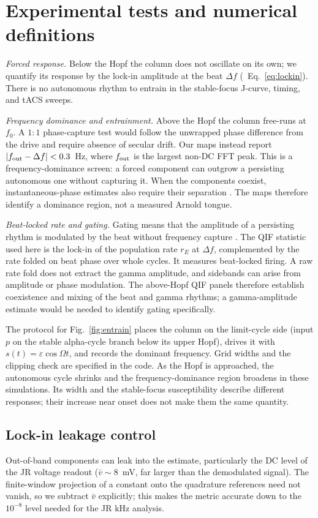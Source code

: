 \documentclass[11pt,a4paper]{article}
\newif\ifjne
\newif\ifsupp
\begin{document}
\section{Experimental tests and numerical definitions}\label{sec:vocab}
\emph{Forced response.} Below the Hopf the column does not oscillate on its own;
we quantify its response by the lock-in amplitude at the beat $\Delta f$
(\ifsupp main-text\fi\ Eq.~\eqref{eq:lockin}). There is no autonomous rhythm to entrain in the stable-focus
J-curve, timing, and tACS sweeps.

\emph{Frequency dominance and entrainment.} Above the Hopf the column free-runs
at $f_0$. A $1{:}1$ phase-capture test would follow the unwrapped phase difference
from the drive and require absence of secular drift. Our maps instead report
$|f_{\rm out}-\Delta f|<0.3$~Hz, where $f_{\rm out}$ is the largest non-DC FFT
peak. This is a frequency-dominance screen: a forced component can outgrow a
persisting autonomous one without capturing it. When the components coexist,
instantaneous-phase estimates also require their separation
\cite{lachaux1999}. The maps therefore identify a dominance region, not a
measured Arnold tongue.

\emph{Beat-locked rate and gating.} Gating means that the amplitude of a
persisting rhythm is modulated by the beat without frequency capture
\cite{canolty2010,tort2010}. The QIF statistic used here is the lock-in of the
population rate $r_E$ at $\Delta f$, complemented by the rate folded on beat
phase over whole cycles. It measures beat-locked firing. A raw rate fold does
not extract the gamma amplitude, and sidebands can arise from amplitude or phase
modulation. The above-Hopf QIF panels therefore establish coexistence and mixing
of the beat and gamma rhythms; a gamma-amplitude estimate would be needed to
identify gating specifically.

The protocol for Fig.~\ref{fig:entrain} places the column on the limit-cycle side
(input $p$ on the stable alpha-cycle branch below its upper Hopf), drives it
with $s(t)=\varepsilon\cos\Omega t$, and records the dominant frequency. Grid
widths and the clipping check are specified in the code. As the Hopf is approached,
the autonomous cycle shrinks and the frequency-dominance region broadens in these
simulations. Its width and the stable-focus susceptibility describe different
responses; their increase near onset does not make them the same quantity.

\ifjne
\subsection{Lock-in leakage control}\label{supp:lockin}
Out-of-band components can leak into the estimate, particularly the DC level of the JR voltage readout ($\bar v\!\sim\!8$~mV, far
larger than the demodulated signal). The finite-window projection of a constant onto the quadrature references
need not vanish, so we subtract $\bar v$ explicitly; this makes the metric
accurate down to the $10^{-8}$ level needed for the JR kHz
analysis.
\end{document}
